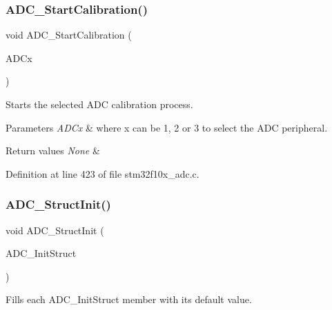 \subsubsection{\texorpdfstring{A\+D\+C\+\_\+\+Start\+Calibration()}{ADC\_StartCalibration()}}
{\footnotesize\ttfamily void A\+D\+C\+\_\+\+Start\+Calibration (\begin{DoxyParamCaption}\item[{\hyperlink{struct_a_d_c___type_def}{A\+D\+C\+\_\+\+Type\+Def} $\ast$}]{A\+D\+Cx }\end{DoxyParamCaption})}



Starts the selected A\+DC calibration process. 


\begin{DoxyParams}{Parameters}
{\em A\+D\+Cx} & where x can be 1, 2 or 3 to select the A\+DC peripheral. \\
\hline
\end{DoxyParams}

\begin{DoxyRetVals}{Return values}
{\em None} & \\
\hline
\end{DoxyRetVals}


Definition at line 423 of file stm32f10x\+\_\+adc.\+c.

\mbox{\label{group___a_d_c___exported___functions_ga6c6e754d1d0a98d56e465efaf73272ec}} 
\subsubsection{\texorpdfstring{A\+D\+C\+\_\+\+Struct\+Init()}{ADC\_StructInit()}}
{\footnotesize\ttfamily void A\+D\+C\+\_\+\+Struct\+Init (\begin{DoxyParamCaption}\item[{\hyperlink{struct_a_d_c___init_type_def}{A\+D\+C\+\_\+\+Init\+Type\+Def} $\ast$}]{A\+D\+C\+\_\+\+Init\+Struct }\end{DoxyParamCaption})}



Fills each A\+D\+C\+\_\+\+Init\+Struct member with its default value. 


